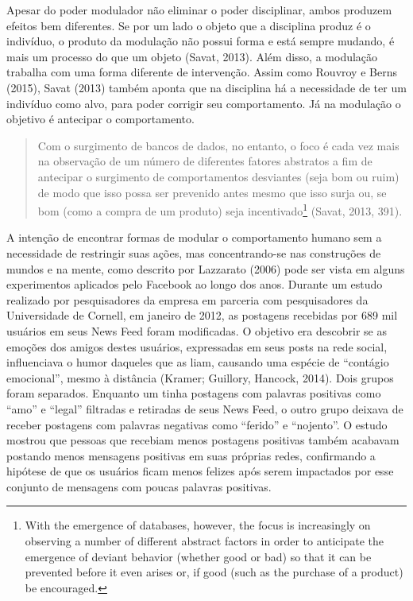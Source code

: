 Apesar do poder modulador não eliminar o poder disciplinar, ambos
produzem efeitos bem diferentes. Se por um lado o objeto que a
disciplina produz é o indivíduo, o produto da modulação não possui forma
e está sempre mudando, é mais um processo do que um objeto
(Savat, 2013). Além disso, a modulação trabalha com uma forma diferente de
intervenção. Assim como Rouvroy e Berns (2015), Savat (2013) também
aponta que na disciplina há a necessidade de ter um indivíduo como alvo,
para poder corrigir seu comportamento. Já na modulação o objetivo é
antecipar o
comportamento.

\begin{quote}
Com o surgimento de bancos de dados, no entanto, o foco é cada vez mais
na observação de um número de diferentes fatores abstratos a fim de
antecipar o surgimento de comportamentos desviantes (seja bom ou ruim)
de modo que isso possa ser prevenido antes mesmo que isso surja ou, se
bom (como a compra de um produto) seja incentivado\footnote{With the
  emergence of databases, however, the focus is increasingly on
  observing a number of different abstract factors in order to
  anticipate the emergence of deviant behavior (whether good or bad) so
  that it can be prevented before it even arises or, if good (such as
  the purchase of a product) be encouraged.}
(Savat, 2013, 391).
\end{quote}

A intenção de encontrar formas de modular o comportamento humano sem a
necessidade de restringir suas ações, mas concentrando-se nas
construções de mundos e na mente, como descrito por Lazzarato (2006)
pode ser vista em alguns experimentos aplicados pelo Facebook ao longo
dos anos. Durante um estudo realizado por pesquisadores da empresa em
parceria com pesquisadores da Universidade de Cornell, em janeiro de
2012, as postagens recebidas por 689 mil usuários em seus News Feed
foram modificadas. O objetivo era descobrir se as emoções dos amigos
destes usuários, expressadas em seus posts na rede social, influenciava
o humor daqueles que as liam, causando uma espécie de ``contágio
emocional'', mesmo à distância (Kramer; Guillory, Hancock, 2014). Dois
grupos foram separados. Enquanto um tinha postagens com palavras
positivas como ``amo'' e ``legal'' filtradas e retiradas de seus News
Feed, o outro grupo deixava de receber postagens com palavras negativas
como ``ferido'' e ``nojento''. O estudo mostrou que pessoas que recebiam
menos postagens positivas também acabavam postando menos mensagens
positivas em suas próprias redes, confirmando a hipótese de que os
usuários ficam menos felizes após serem impactados por esse conjunto de
mensagens com poucas palavras positivas.

